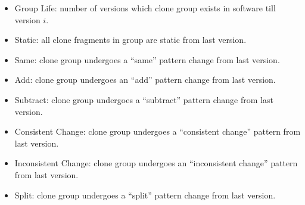 \begin{itemize}
\setlength{\itemsep}{0pt}
\setlength{\parsep}{0pt}
\setlength{\parskip}{0pt}
\item {Group Life}: number of versions which clone group exists in software till version $i$.
\item {Static}:	all clone fragments in group are static from last version.
\item {Same}:	clone group undergoes a ``same'' pattern change from  last version.
\item {Add}: clone group undergoes an ``add'' pattern change from last version.
\item {Subtract}: clone group undergoes a ``subtract'' pattern change from last version.
\item {Consistent Change}: clone group undergoes a ``consistent change'' pattern from last version.
\item {Inconsistent Change}: clone group undergoes an ``inconsistent change'' pattern from last version.
\item {Split}: clone group undergoes a ``split'' pattern change from last version.
\end{itemize}

